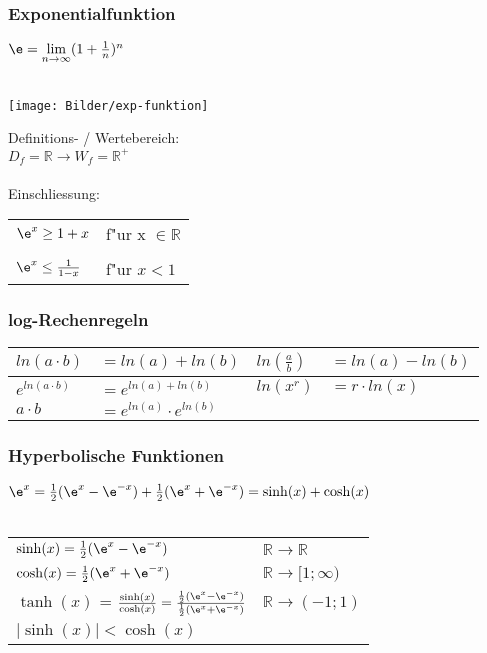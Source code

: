 \subsubsection{Exponentialfunktion}
    $\e = \lim\limits_{n \to \infty} (1+\frac{1}{n})^n $ \\
        \\
    \begin{minipage}{.45\linewidth}
        \texttt{[image: Bilder/exp-funktion]}
    \end{minipage}
    \hfill
    \begin{minipage}{.5\linewidth}
        Definitions- / Wertebereich: \\
        $D_f = \mathbb{R} \rightarrow W_f = \mathbb{R^+}$ \\
        \\
        Einschliessung: \\
            \begin{tabular}{ll}
            $\e^x \geq 1 + x$ & f"ur x $\in \mathbb{R}$ \\
            \\
            $\e^x \leq \frac{1}{1-x}$ & f"ur $x < 1$  \\
            \end{tabular}
    \end{minipage}

\subsubsection{log-Rechenregeln}
    \begin{tabular}{|ll|ll|}
        \hline
        $ln(a \cdot b)$ & $= ln(a) + ln(b)$         & $ln(\frac{a}{b})$ & $= ln(a) - ln(b)$ \\
        \hline
        $e^{ln(a \cdot b)}$ & $= e^{ln(a) + ln(b)}$ & $ln(x^r)$         & $= r \cdot ln(x)$ \\
        \hline
        $a \cdot b$ & $= e^{ln(a)} \cdot e^{ln(b)}$ &                   &                   \\
        \hline
    \end{tabular}

\subsubsection{Hyperbolische Funktionen}
    $\e^x = \frac{1}{2} (\e^x - \e^{-x}) + \frac{1}{2} (\e^x + \e^{-x}) = \sinh(x) + \cosh(x)$ \\
    \\
    \begin{tabular}{ll}
        $\sinh(x) = \frac{1}{2} (\e^x - \e^{-x})$ & $\mathbb{R} \rightarrow \mathbb{R}$ \\
        $\cosh(x) = \frac{1}{2} (\e^x + \e^{-x})$ & $\mathbb{R} \rightarrow [1; \infty)$ \\
        $\tanh(x)$ = $\frac{\sinh(x)}{\cosh(x)} = \frac{\frac{1}{2} (\e^x - \e^{-x})}{\frac{1}{2} (\e^x + \e^{-x})}$ & $\mathbb{R} \rightarrow (-1; 1)$ \\	
        $\vert \sinh(x) \vert < \cosh(x)$	& \\
    \end{tabular}
    
